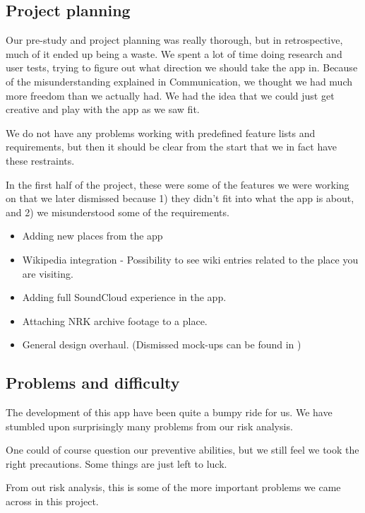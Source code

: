 	\subsection{Project planning}


Our pre-study and project planning was really thorough, but in retrospective, much of it ended up being a waste. We spent a lot of time doing research and user tests, trying to figure out what direction we should take the app in. Because of the misunderstanding explained in Communication, we thought we had much more freedom than we actually had. We had the idea that we could just get creative and play with the app as we saw fit.

We do not have any problems working with predefined feature lists and requirements, but then it should be clear from the start that we in fact have these restraints.

In the first half of the project, these were some of the features we were working on that we later dismissed because 1) they didn't fit into what the app is about, and 2) we misunderstood some of the requirements.

\begin{itemize}
	\item Adding new places from the app
	\item Wikipedia integration - Possibility to see wiki entries related to the place you are visiting.
	\item Adding full SoundCloud experience in the app.
	\item Attaching NRK archive footage to a place. 
	\item General design overhaul.  (Dismissed mock-ups can be found in )
\end{itemize}

	\subsection{Problems and difficulty}

The development of this app have been quite a bumpy ride for us. We have stumbled upon surprisingly many problems from our risk analysis.

One could of course question our preventive abilities, but we still feel we took the right precautions. Some things are just left to luck.

From out risk analysis, this is some of the more important problems we came across in this project. 


